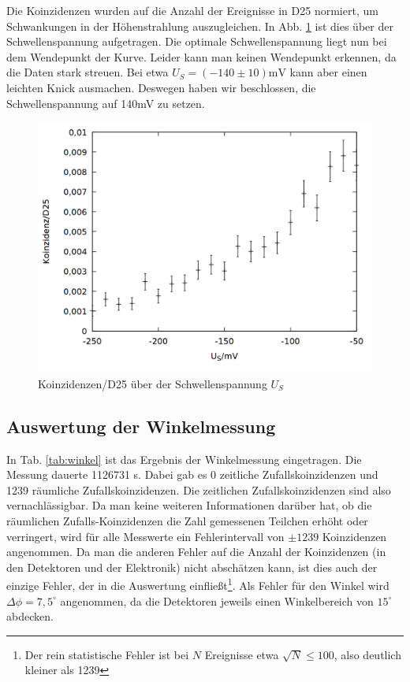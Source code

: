 Die Koinzidenzen wurden auf die Anzahl der Ereignisse in D25 normiert, um Schwankungen in der Höhenstrahlung auszugleichen. In Abb. \ref{fig:schwelle} ist dies über der Schwellenspannung aufgetragen. Die optimale Schwellenspannung liegt nun bei dem Wendepunkt der Kurve. Leider kann man keinen Wendepunkt erkennen, da die Daten stark streuen. Bei etwa $U_S = (-140 \pm 10)\si{\milli \volt}$ kann aber einen leichten Knick ausmachen. Deswegen haben wir beschlossen, die Schwellenspannung auf 140\si{\milli \volt} zu setzen.

\begin{figure}
\centering
\includegraphics[width=0.75\linewidth]{data/friedrich/schwelle.png}
\caption{Koinzidenzen/D25 über der Schwellenspannung $U_S$}
\label{fig:schwelle}
\end{figure}

\subsection{Auswertung der Winkelmessung}
In Tab. \ref{tab:winkel} ist das Ergebnis der Winkelmessung eingetragen. Die Messung dauerte 1126731 \si{\second}. Dabei gab es 0 zeitliche Zufallskoinzidenzen und 1239 räumliche Zufallskoinzidenzen. Die zeitlichen Zufallskoinzidenzen sind also vernachlässigbar. Da man keine weiteren Informationen darüber hat, ob die räumlichen Zufalls-Koinzidenzen die Zahl gemessenen Teilchen erhöht oder verringert, wird für alle Messwerte ein Fehlerintervall von $\pm 1239$ Koinzidenzen angenommen. Da man die anderen Fehler auf die Anzahl der Koinzidenzen (in den Detektoren und der Elektronik) nicht abschätzen kann, ist dies auch der einzige Fehler, der in die Auswertung einfließt\footnote{Der rein statistische Fehler ist bei $N$ Ereignisse etwa $\sqrt{N} \leq 100$, also deutlich kleiner als 1239}. Als Fehler für den Winkel wird $\Delta \phi = 7,5^\circ$ angenommen, da die Detektoren jeweils einen Winkelbereich von $15^\circ$ abdecken.\\ 

